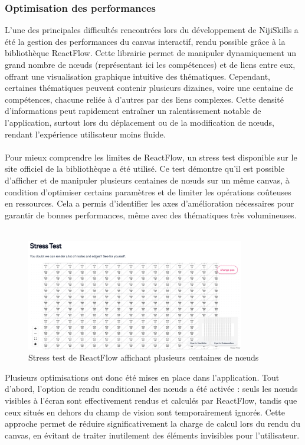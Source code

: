 \documentclass[12pt]{article}
\begin{document}
\subsubsection{Optimisation des performances}
L’une des principales difficultés rencontrées lors du développement de NijiSkills a été la gestion des performances du canvas interactif, rendu possible grâce à la bibliothèque ReactFlow. Cette librairie permet de manipuler dynamiquement un grand nombre de nœuds (représentant ici les compétences) et de liens entre eux, offrant une visualisation graphique intuitive des thématiques. Cependant, certaines thématiques peuvent contenir plusieurs dizaines, voire une centaine de compétences, chacune reliée à d’autres par des liens complexes. Cette densité d’informations peut rapidement entraîner un ralentissement notable de l’application, surtout lors du déplacement ou de la modification de nœuds, rendant l’expérience utilisateur moins fluide.
\\\\
Pour mieux comprendre les limites de ReactFlow, un stress test disponible sur le site officiel de la bibliothèque a été utilisé. Ce test démontre qu’il est possible d’afficher et de manipuler plusieurs centaines de nœuds sur un même canvas, à condition d’optimiser certains paramètres et de limiter les opérations coûteuses en ressources. Cela a permis d’identifier les axes d’amélioration nécessaires pour garantir de bonnes performances, même avec des thématiques très volumineuses.
\\\\
\begin{figure}[H]
  \centering
  \includegraphics[width=0.85\textwidth]{img/stress-test.png}
  \caption{Stress test de ReactFlow affichant plusieurs centaines de nœuds}
\end{figure}
\noindent
Plusieurs optimisations ont donc été mises en place dans l’application. Tout d’abord, l’option de rendu conditionnel des nœuds a été activée : seuls les nœuds visibles à l’écran sont effectivement rendus et calculés par ReactFlow, tandis que ceux situés en dehors du champ de vision sont temporairement ignorés. Cette approche permet de réduire significativement la charge de calcul lors du rendu du canvas, en évitant de traiter inutilement des éléments invisibles pour l’utilisateur.
\end{document}
